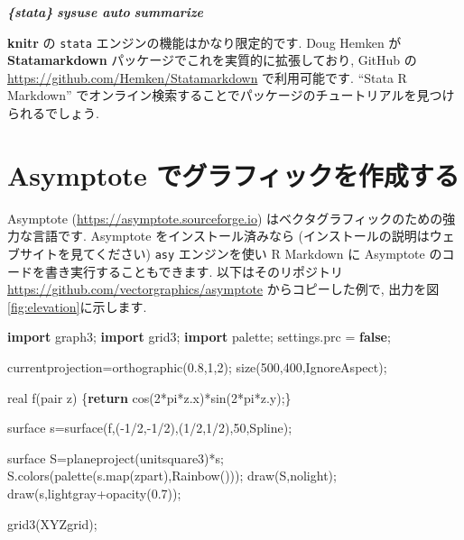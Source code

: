 \documentclass[
  11pt,
  lualatex,
  ja=standard]{bxjsreport}
\newenvironment{Shaded}{\begin{snugshade}}{\end{snugshade}}
\newcommand{\ControlFlowTok}[1]{\textcolor[rgb]{0.13,0.29,0.53}{\textbf{#1}}}
\newcommand{\DecValTok}[1]{\textcolor[rgb]{0.00,0.00,0.81}{#1}}
\newcommand{\FloatTok}[1]{\textcolor[rgb]{0.00,0.00,0.81}{#1}}
\newcommand{\InformationTok}[1]{\textcolor[rgb]{0.56,0.35,0.01}{\textbf{\textit{#1}}}}
\newcommand{\KeywordTok}[1]{\textcolor[rgb]{0.13,0.29,0.53}{\textbf{#1}}}
\newcommand{\NormalTok}[1]{#1}
\begin{document}
\begin{Shaded}
\begin{Highlighting}[]
\InformationTok{\textasciigrave{}\textasciigrave{}\textasciigrave{}\{stata\}}
\InformationTok{sysuse auto}
\InformationTok{summarize}
\InformationTok{\textasciigrave{}\textasciigrave{}\textasciigrave{}}
\end{Highlighting}
\end{Shaded}

\textbf{knitr} の \texttt{stata} エンジンの機能はかなり限定的です. Doug Hemken が \textbf{Statamarkdown} パッケージでこれを実質的に拡張しており, GitHub の \url{https://github.com/Hemken/Statamarkdown} で利用可能です. ``Stata R Markdown'' でオンライン検索することでパッケージのチュートリアルを見つけられるでしょう.

\hypertarget{eng-asy}{%
\section{Asymptote でグラフィックを作成する}\label{eng-asy}}

Asymptote (\url{https://asymptote.sourceforge.io}) はベクタグラフィックのための強力な言語です. Asymptote をインストール済みなら (インストールの説明はウェブサイトを見てください) \texttt{asy} エンジンを使い R Markdown に Asymptote のコードを書き実行することもできます. 以下はそのリポジトリ \url{https://github.com/vectorgraphics/asymptote} からコピーした例で, 出力を図\ref{fig:elevation}に示します.

\begin{Shaded}
\begin{Highlighting}[numbers=left,,]
\KeywordTok{import}\NormalTok{ graph3;}
\KeywordTok{import}\NormalTok{ grid3;}
\KeywordTok{import}\NormalTok{ palette;}
\NormalTok{settings.prc = }\KeywordTok{false}\NormalTok{;}

\NormalTok{currentprojection=orthographic(}\FloatTok{0.8}\NormalTok{,}\DecValTok{1}\NormalTok{,}\DecValTok{2}\NormalTok{);}
\NormalTok{size(}\DecValTok{500}\NormalTok{,}\DecValTok{400}\NormalTok{,IgnoreAspect);}

\NormalTok{real f(pair z) \{}\ControlFlowTok{return}\NormalTok{ cos(}\DecValTok{2}\NormalTok{*pi*z.x)*sin(}\DecValTok{2}\NormalTok{*pi*z.y);\}}

\NormalTok{surface s=surface(f,({-}}\DecValTok{1}\NormalTok{/}\DecValTok{2}\NormalTok{,{-}}\DecValTok{1}\NormalTok{/}\DecValTok{2}\NormalTok{),(}\DecValTok{1}\NormalTok{/}\DecValTok{2}\NormalTok{,}\DecValTok{1}\NormalTok{/}\DecValTok{2}\NormalTok{),}\DecValTok{50}\NormalTok{,Spline);}

\NormalTok{surface S=planeproject(unitsquare3)*s;}
\NormalTok{S.colors(palette(s.map(zpart),Rainbow()));}
\NormalTok{draw(S,nolight);}
\NormalTok{draw(s,lightgray+opacity(}\FloatTok{0.7}\NormalTok{));}

\NormalTok{grid3(XYZgrid);}
\end{Highlighting}
\end{Shaded}
\end{document}
